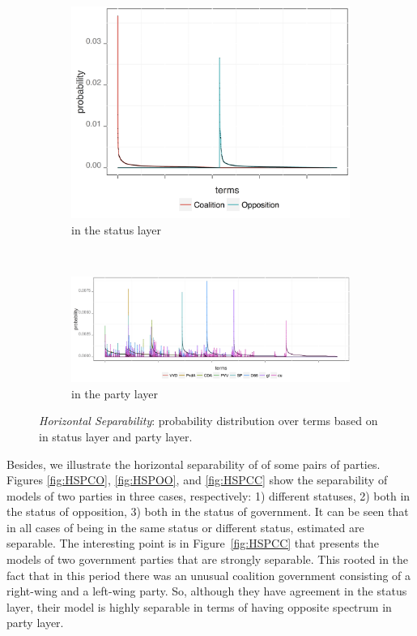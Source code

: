 \begin{figure}[!t]
        \centering
        \begin{subfigure}[b]{0.32\textwidth}
\includegraphics[width=\linewidth]{02-part-01/chapter-03/figs_and_tables/img_opo-coa.png}
\caption{\label{fig:HSS}\achswlm in the status layer}
        \end{subfigure}
        ~ 
                \begin{subfigure}[b]{0.64\textwidth}
\includegraphics[width=\linewidth]{02-part-01/chapter-03/figs_and_tables/img_parties.png}
\caption{\label{fig:HSP}\achswlm in the party layer}
        
        \end{subfigure}
        
        \caption{\label{fig:HS} \emph{Horizontal Separability}: probability distribution over terms based on \hswlms in status layer and party layer.}
\end{figure}

Besides, we illustrate the horizontal separability of \achswlm of some pairs of parties. Figures \ref{fig:HSPCO}, \ref{fig:HSPOO}, and \ref{fig:HSPCC} show the separability of models of two parties in three cases, respectively: 1) different statuses, 2) both in the status of opposition, 3) both in the status of government. It can be seen that in all cases of being in the same status or different status, estimated \hswlms are separable. The interesting point is in Figure~\ref{fig:HSPCC} that presents the models of two government parties that are strongly separable. This rooted in the fact that in this period there was an unusual coalition government consisting of a right\:-\:wing and a left\:-\:wing party. So, although they have agreement in the status layer, their model is highly separable in terms of having opposite spectrum in party layer.


